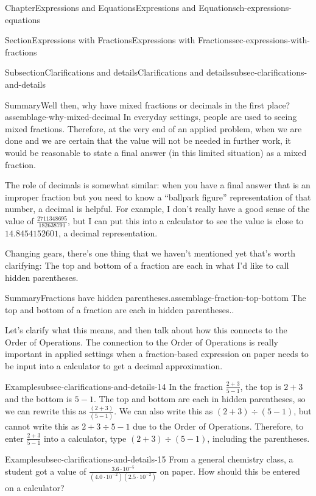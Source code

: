 \documentclass[twoside,11pt,]{book}
\numberwithin{equation}{chapter}
\begin{document}
\begin{chapterptx}{Chapter}{Expressions and Equations}{}{Expressions and Equations}{}{}{ch-expressions-equations}
\begin{sectionptx}{Section}{Expressions with Fractions}{}{Expressions with Fractions}{}{}{sec-expressions-with-fractions}
\begin{subsectionptx}{Subsection}{Clarifications and details}{}{Clarifications and details}{}{}{subsec-clarifications-and-details}
\begin{assemblage}{Summary}{Well then, why have mixed fractions or decimals in the first place?}{assemblage-why-mixed-decimal}
In everyday settings, people are used to seeing mixed fractions. Therefore, at the very end of an applied problem, when we are done and we are certain that the value will not be needed in further work, it would be reasonable to state a final answer (in this limited situation) as a mixed fraction.%
\par
The role of decimals is somewhat similar: when you have a final answer that is an improper fraction but you need to know a ``ballpark figure'' representation of that number, a decimal is helpful. For example, I don't really have a good sense of the value of \(\frac{2711348695}{182638791}\), but I can put this into a calculator to see the value is close to \(14.8454152601\), a decimal representation.%
\end{assemblage}
Changing gears, there's one thing that we haven't mentioned yet that's worth clarifying: The top and bottom of a fraction are each in what I'd like to call hidden parentheses.%
\begin{assemblage}{Summary}{Fractions have hidden parentheses.}{assemblage-fraction-top-bottom}%
The top and bottom of a fraction are each in hidden parentheses..%
\end{assemblage}
Let's clarify what this means, and then talk about how this connects to the Order of Operations. The connection to the Order of Operations is really important in applied settings when a fraction-based expression on paper needs to be input into a calculator to get a decimal approximation.%
\begin{example}{Example}{}{subsec-clarifications-and-details-14}%
In the fraction \(\frac{2+3}{5-1}\), the top is \(2+3\) and the bottom is \(5-1\). The top and bottom are each in hidden parentheses, so we can rewrite this as \(\frac{(2+3)}{(5-1)}\). We can also write this as \((2+3) \div (5-1)\), but cannot write this as \(2+3 \div 5-1\) due to the Order of Operations. Therefore, to enter \(\frac{2+3}{5-1}\) into a calculator, type \((2+3) \div (5-1)\), including the parentheses.%
\end{example}
\begin{example}{Example}{}{subsec-clarifications-and-details-15}%
From a general chemistry class, a student got a value of \(\frac{3.6 \cdot 10^{-5}}{(4.0 \cdot 10^{-2})(2.5 \cdot 10^{-2})}\) on paper. How should this be entered on a calculator?%
\par\smallskip%

\end{example}
\end{subsectionptx}
\end{sectionptx}
\end{chapterptx}
\end{document}
